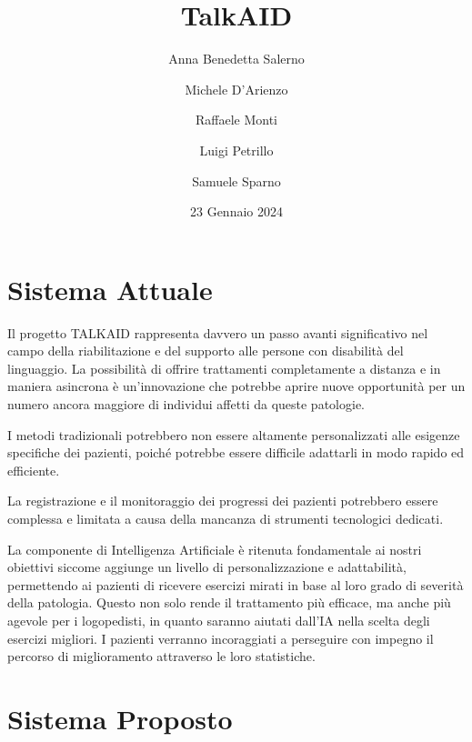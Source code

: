 \documentclass{article}
\begin{document}
    \title{TalkAID}
    \author{
        Anna Benedetta Salerno\\
        \and
        Michele D'Arienzo\\
        \and
        Raffaele Monti\\
        \and
        Luigi Petrillo\\
        \and
        Samuele Sparno\\
    }
    \date{23 Gennaio 2024}

    \maketitle

    \pagebreak

    \section{Sistema Attuale}

    Il progetto TALKAID rappresenta davvero un passo avanti significativo nel campo della riabilitazione e del supporto alle persone con disabilità del
    linguaggio. La possibilità di offrire trattamenti completamente a distanza e in maniera asincrona è un'innovazione che potrebbe aprire nuove opportunità
    per un numero ancora maggiore di individui affetti da queste patologie.

    I metodi tradizionali potrebbero non essere altamente personalizzati alle esigenze specifiche dei pazienti, poiché potrebbe essere difficile adattarli in
    modo rapido ed efficiente.

    La registrazione e il monitoraggio dei progressi dei pazienti potrebbero essere complessa e limitata a causa della mancanza di strumenti tecnologici
    dedicati.

    La componente di Intelligenza Artificiale è ritenuta fondamentale ai nostri obiettivi siccome aggiunge un livello di personalizzazione e adattabilità,
    permettendo ai pazienti di ricevere esercizi mirati in base al loro grado di severità della patologia. Questo non solo rende il trattamento più efficace,
    ma anche più agevole per i logopedisti, in quanto saranno aiutati dall'IA nella scelta degli esercizi migliori. I pazienti verranno incoraggiati a
    perseguire con impegno il percorso di miglioramento attraverso le loro statistiche.

    \section{Sistema Proposto}
\end{document}
